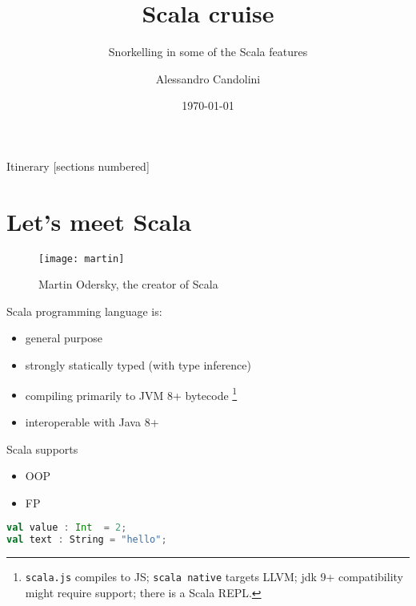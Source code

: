 \documentclass[10pt]{beamer}
\title{Scala cruise}
\subtitle{Snorkelling in some of the Scala features}
\date{\today}
\author[A. Candolini]{Alessandro Candolini}
\begin{document}
\maketitle

\begin{frame}{Itinerary}
  [sections numbered]
  \tableofcontents[hideallsubsections]
\end{frame}

\section{Let's meet Scala}

\begin{frame}
\begin{figure}
\centering
\texttt{[image: martin]}
\caption{Martin Odersky, the creator of Scala}
\end{figure}
\end{frame}


\begin{frame}[fragile]
Scala programming language is:
\begin{itemize}
\item general purpose 
\item strongly statically typed (with type inference) 
\item compiling primarily to JVM 8+ bytecode%
\footnote{\texttt{scala.js} compiles to JS; \texttt{scala native} targets LLVM; jdk 9+ compatibility might require support; there is a Scala REPL.}
\item interoperable with Java 8+
\end{itemize}
\end{frame}

\begin{frame}
Scala supports 
\begin{itemize}
\item OOP
\item FP 
\end{itemize}
\end{frame}

\begin{frame}[fragile]
\begin{lstlisting}[language=Scala, basicstyle=\ttfamily]
val value : Int  = 2;
val text : String = "hello";
\end{lstlisting}
\end{frame}
\end{document}
